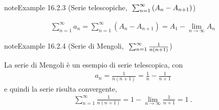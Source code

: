 \documentclass[letterpaper,10pt,italian]{jupyterBook}
\begin{document}
\label{ch/series/series-numerical-real:series-telescopic}
\begin{sphinxadmonition}{note}{Example 16.2.3 (Serie telescopiche, \protect\(\ \sum_{n=1}^{\infty} \left( A_n - A_{n+1} \right)\protect\))}


\begin{equation*}
\begin{split}\sum_{n=1}^{\infty} a_n = \sum_{n=1}^{\infty} \left( A_{n} - A_{n+1} \right) = A_1 - \lim_{n \rightarrow \infty} A_n \end{split}
\end{equation*}\end{sphinxadmonition}
\label{ch/series/series-numerical-real:series-mengoli}
\begin{sphinxadmonition}{note}{Example 16.2.4 (Serie di Mengoli, \protect\(\ \sum_{n=1}^{\infty} \frac{1}{n(n+1)}\protect\))}



\sphinxAtStartPar
La serie di Mengoli è un esempio di serie telescopica, con
\begin{equation*}
\begin{split}a_n = \frac{1}{n(n+1)} = \frac{1}{n} - \frac{1}{n+1}\end{split}
\end{equation*}
\sphinxAtStartPar
e quindi la serie risulta convergente,
\begin{equation*}
\begin{split}\sum_{n=1}^{\infty} \frac{1}{n(n+1)} = 1 - \lim_{n \rightarrow \infty} \frac{1}{n+1} = 1 \ .\end{split}
\end{equation*}\end{sphinxadmonition}
\label{ch/series/series-numerical-real:series-e-euler}
\end{document}
